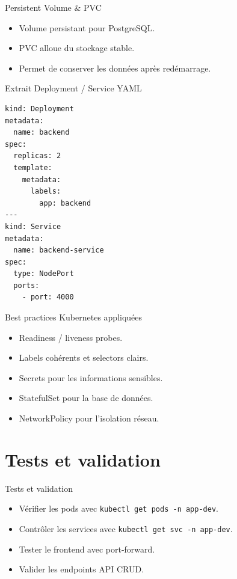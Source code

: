 \documentclass[11pt]{beamer}
\begin{document}
\begin{frame}{Persistent Volume & PVC}
  \begin{itemize}
    \item Volume persistant pour PostgreSQL.
    \item PVC alloue du stockage stable.
    \item Permet de conserver les données après redémarrage.
  \end{itemize}
\end{frame}

\begin{frame}[fragile]{Extrait Deployment / Service YAML}
\begin{lstlisting}
kind: Deployment
metadata:
  name: backend
spec:
  replicas: 2
  template:
    metadata:
      labels:
        app: backend
---
kind: Service
metadata:
  name: backend-service
spec:
  type: NodePort
  ports:
    - port: 4000
\end{lstlisting}
\end{frame}

\begin{frame}{Best practices Kubernetes appliquées}
  \begin{itemize}
    \item Readiness / liveness probes.
    \item Labels cohérents et selectors clairs.
    \item Secrets pour les informations sensibles.
    \item StatefulSet pour la base de données.
    \item NetworkPolicy pour l'isolation réseau.
  \end{itemize}
\end{frame}

\section{Tests et validation}
\begin{frame}{Tests et validation}
  \begin{itemize}
    \item Vérifier les pods avec \texttt{kubectl get pods -n app-dev}.
    \item Contrôler les services avec \texttt{kubectl get svc -n app-dev}.
    \item Tester le frontend avec port-forward.
    \item Valider les endpoints API CRUD.
  \end{itemize}
\end{frame}
\end{document}
